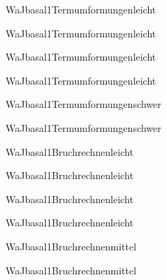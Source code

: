 \documentclass[12pt]{article}
\begin{document}
\begin{Add}{WaJ}{basal1}{Termumformungen}{leicht}
\solution{ }
\end{Add}
\begin{Add}{WaJ}{basal1}{Termumformungen}{leicht}
\end{Add}

\begin{Add}{WaJ}{basal1}{Termumformungen}{leicht}
\solution{ }
\end{Add}
\begin{Add}{WaJ}{basal1}{Termumformungen}{leicht}
\end{Add}

\begin{Add}{WaJ}{basal1}{Termumformungen}{schwer}
\solution{ }
\end{Add}
\begin{Add}{WaJ}{basal1}{Termumformungen}{schwer}
\end{Add}

\begin{Add}{WaJ}{basal1}{Bruchrechnen}{leicht}
\solution{ }
\end{Add}
\begin{Add}{WaJ}{basal1}{Bruchrechnen}{leicht}
\end{Add}

\begin{Add}{WaJ}{basal1}{Bruchrechnen}{leicht}
\solution{ }
\end{Add}
\begin{Add}{WaJ}{basal1}{Bruchrechnen}{leicht}
\end{Add}

\begin{Add}{WaJ}{basal1}{Bruchrechnen}{mittel}
\solution{ }
\end{Add}
\begin{Add}{WaJ}{basal1}{Bruchrechnen}{mittel}
\end{Add}
\end{document}
